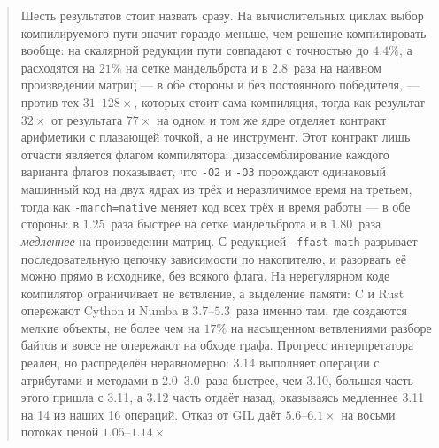 \documentclass[10pt,a4paper]{article}
\newcommand{\meas}[2]{#2}
\newcommand{\code}[1]{\texttt{\small #1}}
\begin{document}
\begin{abstract}
Шесть результатов стоит назвать сразу. На вычислительных циклах выбор компилируемого пути значит
гораздо меньше, чем решение компилировать вообще: на скалярной редукции пути совпадают с точностью
до $\meas{pct:b1_compute-314:arraysum/codon_jit|b1_compute-314:arraysum/codon_pyext_ptr}{4.4}\%$, а расходятся на $\meas{pct:b1_compute-314:mandelbrot/codon_jit|b1_compute-314:mandelbrot/cython}{21}\%$ на сетке мандельброта и в
$\meas{ratio:b1_compute-314:matmul/codon_jit|b1_compute-314:matmul/numba}{2.8}$~раза на наивном произведении матриц --- в обе стороны и без постоянного победителя, --- против
тех $31$--$\meas{ratio:b1_compute-314:matmul/cpython_loop|b1_compute-314:matmul/numba}{128}\times$, которых стоит сама компиляция, тогда как результат $\meas{ratio:b1_compute-314:arraysum/cpython_loop|b1_compute-314:arraysum/numba}{32}\times$ от результата
$\meas{ratio:b1_compute-314:arraysum/cpython_loop|b1_compute-314:arraysum/numba_fastmath}{77}\times$ на одном и том же ядре отделяет контракт арифметики с плавающей точкой, а не
инструмент. Этот контракт лишь отчасти является флагом компилятора: дизассемблирование каждого
варианта флагов показывает, что \code{-O2} и \code{-O3} порождают одинаковый машинный код на двух
ядрах из трёх и неразличимое время на третьем, тогда как \code{-march=native} меняет код всех трёх
и время работы --- в обе стороны: в $\meas{ratio:b1_flags-314:mandelbrot/O2|b1_flags-314:mandelbrot/O3native}{1.25}$~раза быстрее на сетке мандельброта и в $\meas{ratio:b1_flags-314:matmul/O3native|b1_flags-314:matmul/O2}{1.80}$~раза
\emph{медленнее} на произведении матриц. С редукцией \code{-ffast-math} разрывает
последовательную цепочку зависимости по накопителю, и разорвать её можно прямо в исходнике, без
всякого флага. На
нерегулярном коде компилятор ограничивает не ветвление, а выделение памяти: C и Rust опережают
Cython и Numba в $3.7$--$\meas{ratio:b2_branchy-314:binarytrees/numba|b2_branchy-314:binarytrees/rust_ctypes}{5.3}$~раза именно там, где создаются мелкие объекты, не более чем на $\meas{pct:b2_branchy-314:tokenize/numba|b2_branchy-314:tokenize/c_ctypes}{17}\%$
на насыщенном ветвлениями разборе байтов и вовсе не опережают на обходе графа. Прогресс интерпретатора реален, но распределён неравномерно: 3.14
выполняет операции с атрибутами и методами в $2.0$--$\meas{ratio:b3_runtime-v310:attr_set/v310|b3_runtime-v314:attr_set/v314}{3.0}$~раза быстрее, чем 3.10, большая часть
этого пришла с 3.11, а 3.12 часть отдаёт назад, оказываясь медленнее 3.11 на 14 из наших 16
операций. Отказ от GIL даёт $5.6$--$\meas{ratio:b4_threads-ft:py_branchy/ft/T1_control|b4_threads-ft:py_branchy/ft/T8}{6.1}\times$ на восьми потоках ценой $1.05$--$\meas{ratio:b4_threads-ft:single_thread_arith/ft|b4_threads-gil:single_thread_arith/gil}{1.14}\times$

\end{abstract}
\end{document}
